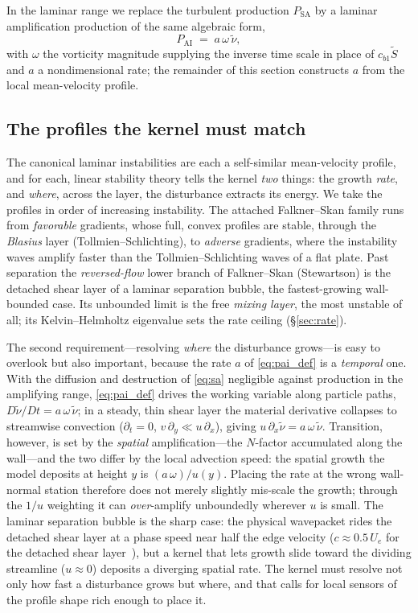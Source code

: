 \documentclass[journal]{new-aiaa}
\begin{document}
In the laminar range we replace the turbulent production $P_\mathrm{SA}$ by a
laminar amplification production of the same algebraic form,
\begin{equation}
  P_\mathrm{AI} \;=\; a\,\omega\,\tilde\nu,
  \label{eq:pai_def}
\end{equation}
with $\omega$ the vorticity magnitude supplying the inverse time scale in place
of $c_{b1}\tilde S$ and $a$ a nondimensional rate; the remainder of this section
constructs $a$ from the local mean-velocity profile.

\subsection{The profiles the kernel must match}\label{sec:reproduce}
The canonical laminar instabilities are each a self-similar mean-velocity
profile, and for each, linear stability theory tells the kernel \emph{two}
things: the growth \emph{rate}, and \emph{where}, across the
layer, the disturbance extracts its energy. We take the profiles in order of
increasing instability. The attached Falkner--Skan family runs from
\emph{favorable} gradients, whose full, convex profiles are stable, through the
\emph{Blasius} layer (Tollmien--Schlichting), to \emph{adverse}
gradients, where the instability waves amplify faster than the
Tollmien--Schlichting waves of a flat plate. Past separation the
\emph{reversed-flow} lower branch of Falkner--Skan (Stewartson) is the detached
shear layer of a laminar separation bubble, the fastest-growing wall-bounded
case. Its unbounded limit is the free \emph{mixing layer}, the most unstable of
all; its Kelvin--Helmholtz eigenvalue sets the rate ceiling (\S\ref{sec:rate}).

The second requirement---resolving \emph{where} the disturbance grows---is easy
to overlook but also important, because the rate $a$ of \eqref{eq:pai_def} is a
\emph{temporal} one. With the diffusion and destruction of \eqref{eq:sa}
negligible against production in the amplifying range, \eqref{eq:pai_def} drives
the working variable along particle paths, $D\tilde\nu/Dt=a\,\omega\,\tilde\nu$;
in a steady, thin shear layer the material derivative collapses to streamwise
convection ($\partial_t\!=\!0$, $v\,\partial_y\!\ll\!u\,\partial_x$), giving
$u\,\partial_x\tilde\nu = a\,\omega\,\tilde\nu$.
Transition, however, is set by the \emph{spatial} amplification---the
$N$-factor accumulated along the wall---and the two differ by the local
advection speed: the spatial growth the model deposits at height $y$ is
$(a\,\omega)/u(y)$. Placing the rate at the wrong wall-normal station therefore
does not merely slightly mis-scale the growth; through the $1/u$ weighting it
can \emph{over}-amplify unboundedly wherever $u$ is small. The laminar separation bubble is the
sharp case: the physical wavepacket rides the detached shear layer at a phase
speed near half the edge velocity ($c\!\approx\!0.5\,U_e$ for the detached
shear layer~\cite{michalke_1964}), but a kernel that lets growth slide toward
the dividing streamline ($u\!\approx\!0$) deposits a diverging spatial rate. The
kernel must resolve not only how fast a disturbance grows but where, and that
calls for local sensors of the profile shape rich enough to place it.
\end{document}
